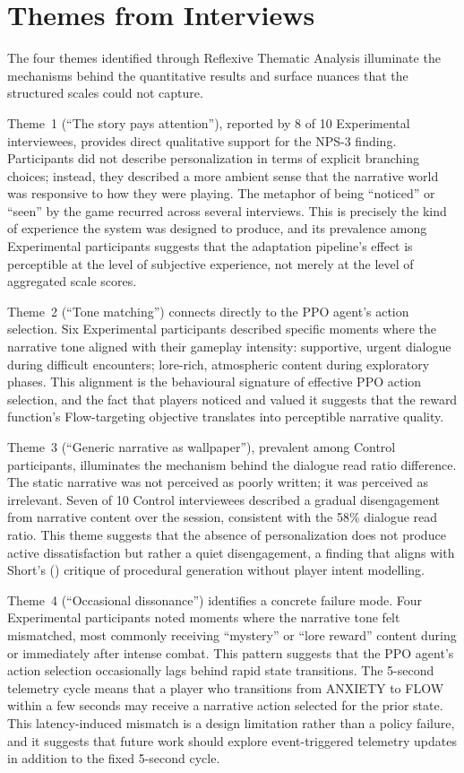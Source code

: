 \section{Themes from Interviews}

The four themes identified through Reflexive Thematic Analysis illuminate the mechanisms behind the quantitative results and surface nuances that the structured scales could not capture.

Theme~1 (``The story pays attention''), reported by 8 of 10 Experimental interviewees, provides direct qualitative support for the NPS-3 finding. Participants did not describe personalization in terms of explicit branching choices; instead, they described a more ambient sense that the narrative world was responsive to how they were playing. The metaphor of being ``noticed'' or ``seen'' by the game recurred across several interviews. This is precisely the kind of experience the system was designed to produce, and its prevalence among Experimental participants suggests that the adaptation pipeline's effect is perceptible at the level of subjective experience, not merely at the level of aggregated scale scores.

Theme~2 (``Tone matching'') connects directly to the PPO agent's action selection. Six Experimental participants described specific moments where the narrative tone aligned with their gameplay intensity: supportive, urgent dialogue during difficult encounters; lore-rich, atmospheric content during exploratory phases. This alignment is the behavioural signature of effective PPO action selection, and the fact that players noticed and valued it suggests that the reward function's Flow-targeting objective translates into perceptible narrative quality.

Theme~3 (``Generic narrative as wallpaper''), prevalent among Control participants, illuminates the mechanism behind the dialogue read ratio difference. The static narrative was not perceived as poorly written; it was perceived as irrelevant. Seven of 10 Control interviewees described a gradual disengagement from narrative content over the session, consistent with the 58\% dialogue read ratio. This theme suggests that the absence of personalization does not produce active dissatisfaction but rather a quiet disengagement, a finding that aligns with Short's (\citeyear{short2019procedural}) critique of procedural generation without player intent modelling.

Theme~4 (``Occasional dissonance'') identifies a concrete failure mode. Four Experimental participants noted moments where the narrative tone felt mismatched, most commonly receiving ``mystery'' or ``lore reward'' content during or immediately after intense combat. This pattern suggests that the PPO agent's action selection occasionally lags behind rapid state transitions. The 5-second telemetry cycle means that a player who transitions from ANXIETY to FLOW within a few seconds may receive a narrative action selected for the prior state. This latency-induced mismatch is a design limitation rather than a policy failure, and it suggests that future work should explore event-triggered telemetry updates in addition to the fixed 5-second cycle.

